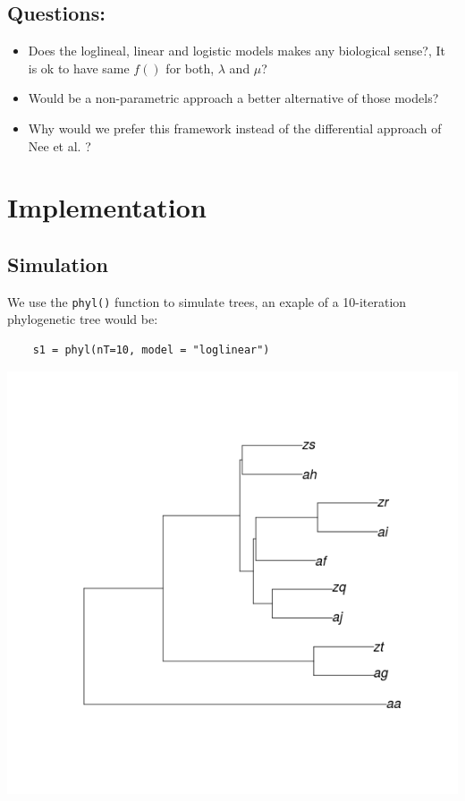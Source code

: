 \documentclass[11pt]{article} %
\begin{document}
\subsection{Questions:}

	\begin{itemize}
		\item Does the loglineal, linear and logistic models makes any biological sense?, It is ok to have same $f()$ for both, $\lambda$ and $\mu$?
		\item Would be a non-parametric approach a better alternative of those models?
		
		\item Why would we prefer this framework instead of the differential approach of Nee et al. ?
	

	\end{itemize}



\section{Implementation}


\subsection{Simulation}

We use the \verb|phyl()| function to simulate trees, an exaple of a 10-iteration phylogenetic tree would be:  
	\begin{verbatim}
	s1 = phyl(nT=10, model = "loglinear")
	\end{verbatim}

	 \includegraphics[scale=0.5]{phylo.png}
\end{document}
